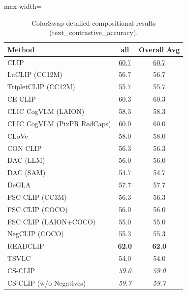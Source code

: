 \begin{table}[t]
  \centering
  \scriptsize
  \caption{ColorSwap detailed compositional results (text_contrastive_accuracy).}
  \label{tab:ColorSwap_detailed}
  \begin{adjustbox}{max width=\textwidth}
  \setlength{\tabcolsep}{2pt}
  \begin{tabular}{p{5cm}c|c}
    \toprule
    Method & all & Overall Avg \\
    \midrule
    CLIP & \underline{60.7} & \underline{60.7} \\
    \midrule
    LaCLIP (CC12M) & 56.7 & 56.7 \\
    TripletCLIP (CC12M) & 55.7 & 55.7 \\
    \midrule
    CE CLIP & 60.3 & 60.3 \\
    CLIC CogVLM (LAION) & 58.3 & 58.3 \\
    CLIC CogVLM (PixPR RedCaps) & 60.0 & 60.0 \\
    CLoVe & 58.0 & 58.0 \\
    CON CLIP & 56.3 & 56.3 \\
    DAC (LLM) & 56.0 & 56.0 \\
    DAC (SAM) & 54.7 & 54.7 \\
    DeGLA & 57.7 & 57.7 \\
    FSC CLIP (CC3M) & 56.3 & 56.3 \\
    FSC CLIP (COCO) & 56.0 & 56.0 \\
    FSC CLIP (LAION+COCO) & 55.0 & 55.0 \\
    NegCLIP (COCO) & 55.3 & 55.3 \\
    READCLIP & \textbf{62.0} & \textbf{62.0} \\
    TSVLC & 54.0 & 54.0 \\
    \midrule
    CS-CLIP & \emph{59.0} & \emph{59.0} \\
    CS-CLIP (w/o Negatives) & \emph{59.7} & \emph{59.7} \\
    \bottomrule
  \end{tabular}
  \end{adjustbox}
\end{table}